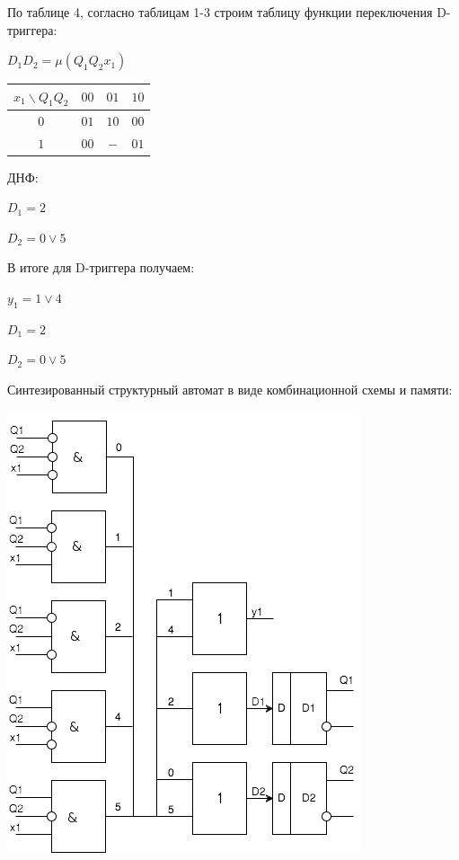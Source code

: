По таблице 4, согласно таблицам 1-3 строим таблицу функции переключения
D-триггера:

$D_1D_2 = \mu(Q_1Q_2x_1)$

\begin{table}[H]
\begin{tabular}{|c|c|c|c|}
\hline
$x_1 \backslash Q_1Q_2$ & $00$ & $01$ & $10$ \\ \hline
$0$          & $01$ & $10$ & $00$ \\ \hline
$1$          & $00$ & $- $ & $01$  \\ \hline
\end{tabular}
\end{table}

ДНФ:

$D_1 = 2$

$D_2 = 0 \vee 5$

В итоге для D-триггера получаем:

$y_1 = 1 \vee 4$

$D_1 = 2$

$D_2 = 0 \vee 5$


Синтезированный структурный автомат в виде комбинационной схемы и памяти:

\includegraphics{img/d.png}

